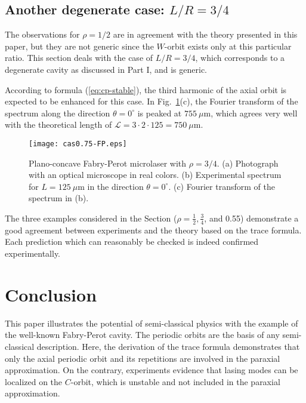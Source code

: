 \documentclass[10pt]{iopart}
\begin{document}
\subsection{Another degenerate case: $L/R = 3/4$} \label{sec:exp-0.75}

The observations for $\rho = 1/2$ are in agreement with the theory presented in this paper, but they are not generic since the $W$-orbit exists only at this particular ratio. This section deals with the case of $L/R = 3/4$, which corresponds to a degenerate cavity as discussed in Part I, and is generic. %

According to formula (\ref{eq:cp-stable}), the third harmonic of the axial orbit is expected to be enhanced for this case. In Fig.~\ref{fig:spectre-0.75}(c), the Fourier transform of the spectrum along the direction $\theta = 0^{\circ}$ is peaked at $755~\mu$m, which agrees very well with the theoretical length of $\mathcal{L} = 3 \cdot 2 \cdot 125 = 750~\mu$m.\\

\begin{figure}
\begin{center}
\texttt{[image: cas0.75-FP.eps]}
\end{center}
\caption{Plano-concave Fabry-Perot microlaser with $\rho = 3/4$. (a) Photograph with an optical microscope in real colors. (b) Experimental spectrum for $L=125~\mu$m in the direction $\theta = 0^{\circ}$. (c) Fourier transform of the spectrum in (b).}
\label{fig:spectre-0.75}
\end{figure}

The three examples considered in the Section ($\rho=\frac{1}{2}, \frac{3}{4}$, and 0.55) demonstrate a good agreement between experiments and the theory based on the trace formula. Each prediction which can reasonably be checked is indeed confirmed experimentally.

\section{Conclusion}

This paper illustrates the potential of semi-classical physics with the example of the well-known Fabry-Perot cavity. The periodic orbits are the basis of any semi-classical description. Here, the derivation of the trace formula demonstrates that only the axial periodic orbit and its repetitions are involved in the paraxial approximation. On the contrary, experiments evidence that lasing modes can be localized on the $C$-orbit, which is unstable and not included in the paraxial approximation.\\
\end{document}
